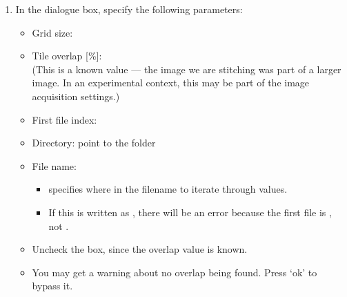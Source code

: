 \documentclass[letterpaper,10pt,english]{jupyterBook}
\begin{document}
\sphinxAtStartPar
{}
\begin{enumerate}
%
\setcounter{enumi}{1}
\item {} 
\sphinxAtStartPar
In the dialogue box, specify the following parameters:
\begin{itemize}
\item {} 
\sphinxAtStartPar
Grid size: 

\item {} 
\sphinxAtStartPar
Tile overlap {[}\%{]}: \\
(This is a known value — the image we are stitching was part of a larger image. In an experimental context, this may be part of the image acquisition settings.)

\item {} 
\sphinxAtStartPar
First file index: 

\item {} 
\sphinxAtStartPar
Directory: point to the  folder

\item {} 
\sphinxAtStartPar
File name: 
\begin{itemize}
\item {} 
\sphinxAtStartPar
{} specifies where in the filename to iterate through values.

\item {} 
\sphinxAtStartPar
If this is written as , there will be an error because the first file is , not .

\end{itemize}

\item {} 
\sphinxAtStartPar
Uncheck the  box, since the overlap value is known.

\item {} 
\sphinxAtStartPar
You may get a warning about no overlap being found. Press ‘ok’ to bypass it.

\end{itemize}

\end{enumerate}
\end{document}
